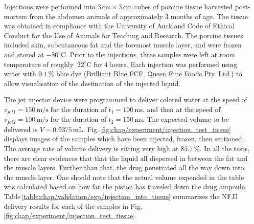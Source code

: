         
            Injections were performed into $3\,\mathrm{cm} \times 3\,\mathrm{cm}$ cubes of porcine tissue harvested post-mortem from the abdomen animals of approximately 3 months of age. The tissue was obtained in compliance with the University of Auckland Code of Ethical Conduct for the Use of Animals for Teaching and Research. The porcine tissues included skin, subcutaneous fat and the foremost muscle layer, and were frozen and stored at $-80^{\circ}\mathrm{C}$. Prior to the injections, three samples were left at room temperature of roughly $~22^{\circ}\mathrm{C}$ for 4 hours. Each injection was performed using water with $0.1\,\%$ blue dye (Brilliant Blue FCF, Queen Fine Foods Pty. Ltd.) to allow visualisation of the destination of the injected liquid.
            
            
            The jet injector device were programmed to deliver colored water at the speed of $v_{jet1}=150\,\mathrm{m/s}$ for the duration of $t_1=100\,\mathrm{ms}$, and then at the speed of $v_{jet2}=100\,\mathrm{m/s}$ for the duration of $t_2=150\,\mathrm{ms}$. The expected volume to be delivered is $V=0.9375\,\mathrm{mL}$. Fig.\,\ref{fig:chap/experiment/injection_test_tissue} displays images of the samples which have been injected, frozen, then sectioned. The average rate of volume delivery is sitting very high at $85.7\,\%$. In all the tests, there are clear evidences that that the liquid all dispersed in between the fat and the muscle layers. Further than that, the drug penetrated all the way down into the muscle layer. One should note that the actual volume expended in the table was calculated based on how far the piston has traveled down the drug ampoule. Table\,\ref{table:chap/validation/exp/injection_into_tissue} summarizes the \acs{NFJI} delivery results for each of the samples in Fig.\,\ref{fig:chap/experiment/injection_test_tissue}.
            
